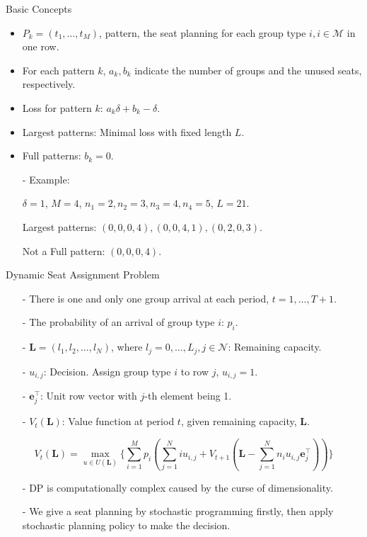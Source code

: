   \begin{frame}{Basic Concepts}
    \begin{itemize}
      \item $P_{k} = (t_1, \ldots, t_M)$, pattern, the seat planning for each group type $i, i \in \mathcal{M}$ in one row.
      \item For each pattern $k$, $a_k, b_k$ indicate the number of groups and the unused seats, respectively.
      \item Loss for pattern $k$: $a_k \delta + b_k - \delta$.
      \item Largest patterns: Minimal loss with fixed length $L$. 
      \item Full patterns: $b_k =0$.
      \item[-] {\color{blue} Example}: 
      
      $\delta = 1$, $M =4$, $n_1 = 2, n_2 = 3, n_3 = 4, n_4 = 5$, $L = 21$.
      
      Largest patterns: $(0, 0, 0, 4), (0, 0, 4, 1), (0, 2, 0, 3)$.
      
      Not a Full pattern: $(0, 0, 0, 4)$.
    \end{itemize}
  \end{frame}

  \begin{frame}{Dynamic Seat Assignment Problem}
    \centering
    \small
    \begin{itemize}
    \item[-] There is one and only one group arrival at each period, $t = 1, \ldots, T+1$. 
    \item[-] The probability of an arrival of group type $i$: $p_i$.  
    \item[-] $\mathbf{L} = (l_1, l_2, \ldots, l_{N})$, where $l_j =0,\ldots, L_j, j\in \mathcal{N}$: Remaining capacity.
    \item[-] $u_{i,j}$: Decision. Assign group type $i$ to row $j$, $u_{i,j} =1$.
    \item[-] $\mathbf{e}_j^{\top}$: Unit row vector with $j$-th element being 1.
    \item[-] $V_{t}(\mathbf{L})$: Value function at period $t$, given remaining capacity, $\mathbf{L}$.
    \end{itemize}

    $$V_{t}(\mathbf{L}) = \max_{u \in U(\mathbf{L})}\{ \sum_{i=1}^{M} p_i ( \sum_{j=1}^{N} i u_{i,j} + V_{t+1}(\mathbf{L}- \sum_{j=1}^{N} n_i u_{i,j}\mathbf{e}_j^{\top} ))\}$$

    \small
    \begin{itemize}
      \item[-] DP is computationally complex caused by the curse of dimensionality.
      \item[-] We give a seat planning by stochastic programming firstly, then apply stochastic planning policy to make the decision.
    \end{itemize}
\end{frame}